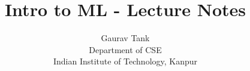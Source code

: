 \documentclass{article}
\title{Intro to ML - Lecture Notes}
\author{
    Gaurav Tank                                     \\
    Department of CSE                               \\
    Indian Institute of Technology, Kanpur          \\
}
\begin{document}
\maketitle


    \medspace
    
    \medspace
    
    \medspace
    
    \medskip



% 
% 
\end{document}
